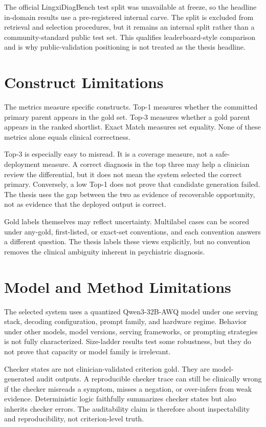 The official LingxiDiagBench test split was unavailable at freeze, so the headline in-domain results use a pre-registered internal carve. The split is excluded from retrieval and selection procedures, but it remains an internal split rather than a community-standard public test set. This qualifies leaderboard-style comparison and is why public-validation positioning is not treated as the thesis headline.

\section{Construct Limitations}

The metrics measure specific constructs. Top-1 measures whether the committed primary parent appears in the gold set. Top-3 measures whether a gold parent appears in the ranked shortlist. Exact Match measures set equality. None of these metrics alone equals clinical correctness.

Top-3 is especially easy to misread. It is a coverage measure, not a safe-deployment measure. A correct diagnosis in the top three may help a clinician review the differential, but it does not mean the system selected the correct primary. Conversely, a low Top-1 does not prove that candidate generation failed. The thesis uses the gap between the two as evidence of recoverable opportunity, not as evidence that the deployed output is correct.

Gold labels themselves may reflect uncertainty. Multilabel cases can be scored under any-gold, first-listed, or exact-set conventions, and each convention answers a different question. The thesis labels these views explicitly, but no convention removes the clinical ambiguity inherent in psychiatric diagnosis.

\section{Model and Method Limitations}

The selected system uses a quantized Qwen3-32B-AWQ model under one serving stack, decoding configuration, prompt family, and hardware regime. Behavior under other models, model versions, serving frameworks, or prompting strategies is not fully characterized. Size-ladder results test some robustness, but they do not prove that capacity or model family is irrelevant.

Checker states are not clinician-validated criterion gold. They are model-generated audit outputs. A reproducible checker trace can still be clinically wrong if the checker misreads a symptom, misses a negation, or over-infers from weak evidence. Deterministic logic faithfully summarizes checker states but also inherits checker errors. The auditability claim is therefore about inspectability and reproducibility, not criterion-level truth.

